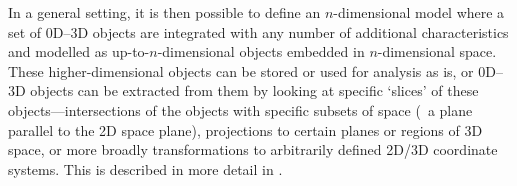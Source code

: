 
In a general setting, it is then possible to define an $n$-dimensional model where a set of 0D--3D objects are integrated with any number of additional characteristics and modelled as up-to-$n$-dimensional objects embedded in $n$-dimensional space.
These higher-dimensional objects can be stored or used for analysis as is, or 0D--3D objects can be extracted from them by looking at specific `slices' of these objects---intersections of the objects with specific subsets of space (\eg\ a plane parallel to the 2D space plane), projections to certain planes or regions of 3D space, or more broadly transformations to arbitrarily defined 2D/3D coordinate systems.
This is described in more detail in .

